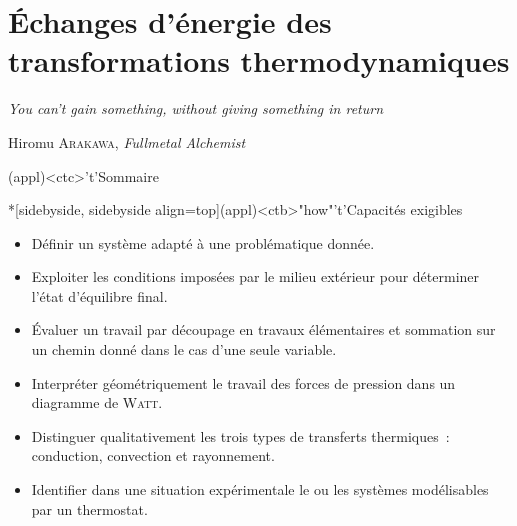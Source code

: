 \documentclass[../../main/main.tex]{subfiles}
\begin{document}
\setcounter{chapter}{1}


\chapter{Échanges d'énergie des transformations thermodynamiques}

\epigraph{\openquote\textit{You can't gain something, without giving something
		in return}\closequote}{Hiromu \textsc{Arakawa}, \textit{Fullmetal Alchemist}}

\vspace*{\fill}

\begin{tcn}(appl)<ctc>'t'{Sommaire}
	\let\item\olditem
	\vspace{-15pt}
	\minitoc
	\vspace{-25pt}
\end{tcn}

\begin{tcn}*[sidebyside, sidebyside align=top](appl)<ctb>"how"'t'{Capacités exigibles}
	\begin{itemize}[label=\rcheck]
		\item Définir un système adapté à une problématique donnée.

		\item Exploiter les conditions imposées par le milieu extérieur pour
		      déterminer l'état d'équilibre final.

		\item Évaluer un travail par découpage en travaux élémentaires et sommation
		      sur un chemin donné dans le cas d'une seule variable.
	\end{itemize}
	\tcblower
	\begin{itemize}[label=\rcheck]
		\item Interpréter géométriquement le travail des forces de pression dans un
		      diagramme de \textsc{Watt}.

		\item Distinguer qualitativement les trois types de transferts thermiques~:
		      conduction, convection et rayonnement.

		\item Identifier dans une situation expérimentale le ou les systèmes
		      modélisables par un thermostat.
	\end{itemize}
\end{tcn}
\end{document}
